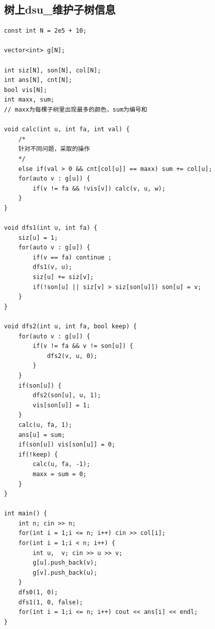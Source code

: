 \documentclass[twoside]{article}
\begin{document}
\subsection{树上dsu_维护子树信息}
\begin{lstlisting}
const int N = 2e5 + 10;

vector<int> g[N];

int siz[N], son[N], col[N];
int ans[N], cnt[N];
bool vis[N];
int maxx, sum;
// maxx为每棵子树里出现最多的颜色，sum为编号和

void calc(int u, int fa, int val) {
    /*
    针对不同问题，采取的操作
    */
    else if(val > 0 && cnt[col[u]] == maxx) sum += col[u];
    for(auto v : g[u]) {
        if(v != fa && !vis[v]) calc(v, u, w);
    }
}

void dfs1(int u, int fa) {
    siz[u] = 1;
    for(auto v : g[u]) {
        if(v == fa) continue ;
        dfs1(v, u);
        siz[u] += siz[v];
        if(!son[u] || siz[v] > siz[son[u]]) son[u] = v;
    }
}

void dfs2(int u, int fa, bool keep) {
    for(auto v : g[u]) {
        if(v != fa && v != son[u]) {
            dfs2(v, u, 0);
        }
    }
    if(son[u]) {
        dfs2(son[u], u, 1);
        vis[son[u]] = 1;
    }
    calc(u, fa, 1);
    ans[u] = sum;
    if(son[u]) vis[son[u]] = 0;
    if(!keep) {
        calc(u, fa, -1);
        maxx = sum = 0;
    }
}

int main() {
    int n; cin >> n;
    for(int i = 1;i <= n; i++) cin >> col[i];
    for(int i = 1;i < n; i++) {
        int u,  v; cin >> u >> v;
        g[u].push_back(v);
        g[v].push_back(u);
    }
    dfs0(1, 0);
    dfs1(1, 0, false);
    for(int i = 1;i <= n; i++) cout << ans[i] << endl;
}\end{lstlisting}
\end{document}
